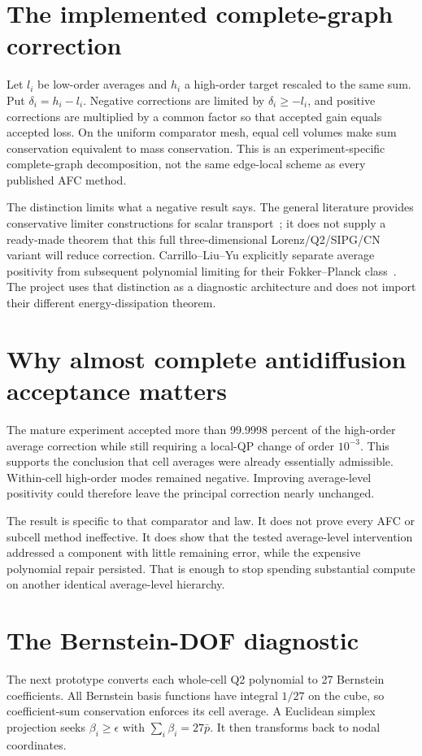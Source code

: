 \section{The implemented complete-graph correction}
Let $l_i$ be low-order averages and $h_i$ a high-order target rescaled to the same sum. Put $\delta_i=h_i-l_i$. Negative corrections are limited by $\delta_i\ge-l_i$, and positive corrections are multiplied by a common factor so that accepted gain equals accepted loss. On the uniform comparator mesh, equal cell volumes make sum conservation equivalent to mass conservation. This is an experiment-specific complete-graph decomposition, not the same edge-local scheme as every published AFC method.

The distinction limits what a negative result says. The general literature provides conservative limiter constructions for scalar transport~\cite{kuzmin}; it does not supply a ready-made theorem that this full three-dimensional Lorenz/Q2/SIPG/CN variant will reduce correction. Carrillo--Liu--Yu explicitly separate average positivity from subsequent polynomial limiting for their Fokker--Planck class~\cite{carrillo}. The project uses that distinction as a diagnostic architecture and does not import their different energy-dissipation theorem.

\section{Why almost complete antidiffusion acceptance matters}
The mature experiment accepted more than 99.9998 percent of the high-order average correction while still requiring a local-QP change of order $10^{-3}$. This supports the conclusion that cell averages were already essentially admissible. Within-cell high-order modes remained negative. Improving average-level positivity could therefore leave the principal correction nearly unchanged.

The result is specific to that comparator and law. It does not prove every AFC or subcell method ineffective. It does show that the tested average-level intervention addressed a component with little remaining error, while the expensive polynomial repair persisted. That is enough to stop spending substantial compute on another identical average-level hierarchy.

\section{The Bernstein-DOF diagnostic}
The next prototype converts each whole-cell Q2 polynomial to 27 Bernstein coefficients. All Bernstein basis functions have integral $1/27$ on the cube, so coefficient-sum conservation enforces its cell average. A Euclidean simplex projection seeks $\beta_i\ge\epsilon$ with $\sum_i\beta_i=27\bar p$. It then transforms back to nodal coordinates.

